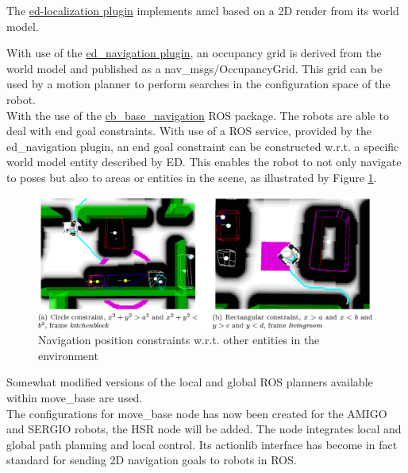 The \href{{https://github.com/tue-robotics/ed_localization}}{\acrshort{ed}-localization plugin} implements \acrshort{amcl} based on a 2D render from its world model.

With use of the \href{https://github.com/tue-robotics/ed_navigation}{ed\_navigation plugin}, an occupancy grid is derived from the world model and published as a nav\_msgs/OccupancyGrid. This grid can be used by a motion planner to perform searches in the configuration space of the robot.
\\
With the use of the \href{https://github.com/tue-robotics/cb_base_navigation}{cb\_base\_navigation} ROS package. The robots are able to deal with end goal constraints. With use of a ROS service, provided by the ed\_navigation plugin, an end goal constraint can be constructed w.r.t. a specific world model entity described by ED. This enables the robot to not only navigate to poses but also to areas or entities in the scene, as illustrated by Figure \ref{fig:ed_navigation_constraints}.
\begin{figure}[h]
    \centering
	\includegraphics[width = 0.9\linewidth]{Figures/ed_navigation_constraints}
	\caption{Navigation position constraints w.r.t. other entities in the environment}
	\label{fig:ed_navigation_constraints}
\end{figure}
Somewhat modified versions of the local and global ROS planners available within move\_base are used. \\The configurations for move\_base node has now been created for the AMIGO and SERGIO robots, the HSR node will be added. The node integrates local and global path planning and local control. Its actionlib interface has become in fact standard for sending 2D navigation goals to robots in ROS. 